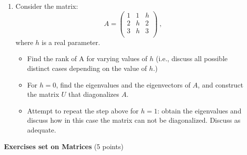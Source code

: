 \documentclass[fleqn]{article}
\begin{document}
\begin{enumerate}
  \item Consider the matrix:
    $$
    A=\left(
    \begin{array}{ccc}
    1 & 1 & h \\
    2 & h & 2 \\
    3 & h & 3 \\
    \end{array}
    \right)~,
    $$
    where $h$ is a real parameter.  
    \begin{itemize}
    \item Find the rank of A for varying values of $h$ (i.e., discuss all possible distinct cases depending on the value of $h$.) 
  
    \item  For $h=0$, find the eigenvalues and the eigenvectors of $A$, and construct the matrix $U$ that diagonalizes $A$. 
  
    \item Attempt to repeat the step above for $h=1$: obtain the eigenvalues and discuss how in this case the matrix can not be diagonalized. Discuss as adequate. 
    \end{itemize}
  
  
  \end{enumerate}

\pagebreak


\textbf{Exercises set on Matrices} (5 points)
\end{document}
